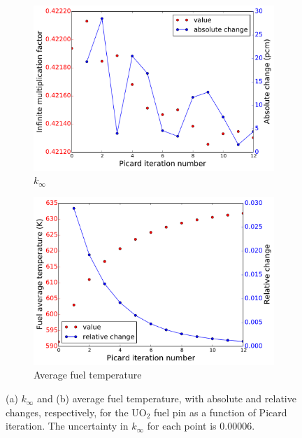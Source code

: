 \documentclass[letterpaper]{physor2018}
\begin{document}
\begin{figure}[!htb]
\centering
\begin{subfigure}{.5\textwidth}
  \centering
  \includegraphics[width=0.75\linewidth]{../Figures/k_eff.pdf}
  \caption{\(k_{\infty}\)}
\end{subfigure}%
\begin{subfigure}{.5\textwidth}
  \centering
  \includegraphics[width=0.75\linewidth]{../Figures/temp.pdf}
  \caption{Average fuel temperature}
\end{subfigure}
\caption{(a) \(k_{\infty}\) and (b) average
fuel temperature, with absolute and relative changes, respectively,
for the UO$_2$ fuel pin as a function of Picard iteration. The uncertainty
in \(k_{\infty}\) for each point is 0.00006.}
\label{fig:k_avgtmp}
\end{figure}
\end{document}

